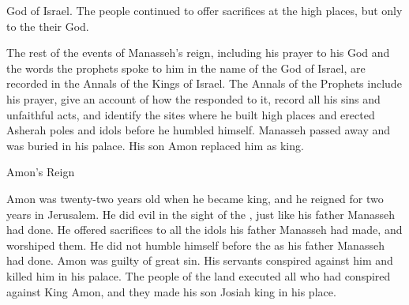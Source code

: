 {{}
God
of Israel.
The people
continued
to offer sacrifices
at the high places,
but only
to the
{}
their God.
\par }{\PP {}The rest
of the events
of Manasseh’s
reign, including his prayer
to
his God
and the words
the prophets
spoke
to him
in the name
of the {}
God
of Israel,
are recorded
in the Annals
of the Kings
of Israel.
The Annals
of the Prophets
include
his prayer,
give an account of how
the
{} responded
to it, record
all
his sins
and unfaithful acts,
and identify the sites
where
he built
high places
and erected
Asherah poles
and idols
before
he humbled himself.
Manasseh
passed away
and was buried
in his palace.
His son
Amon
replaced
him as king.
\par }{\SH Amon’s Reign
\par }{\PP {}Amon
was twenty-two
years
old
when he became king,
and he reigned
for two
years
in Jerusalem.
He did
evil
in the sight
of the
{}, just
like his father
Manasseh
had
done.
He offered sacrifices
to all
the idols
his
father
Manasseh
had made, and worshiped them.
He did not
humble
himself before
the {}
as his father
Manasseh
had done. Amon
was guilty
of great sin.
His servants
conspired
against
him and killed
him in his palace.
The people
of the land
executed
all
who had conspired
against
King
Amon,
and they made his son
Josiah
king
in his place.

}

